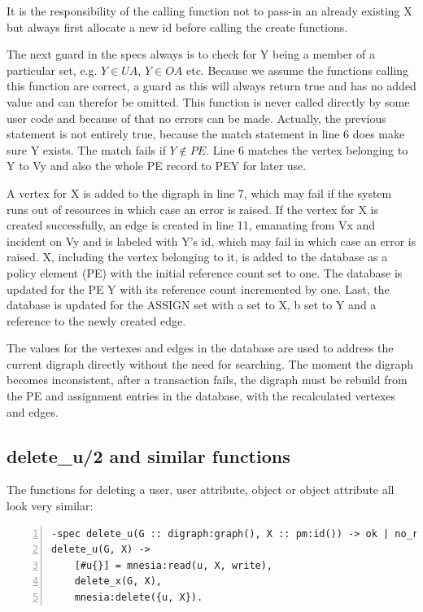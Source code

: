 \documentclass[12pt,a4paper,titlepage]{book}
\begin{document}
		It is the responsibility of the calling function not to pass-in an already existing X but always first allocate a new id before calling the create functions.
		
		The next guard in the specs always is to check for Y being a member of a particular set, e.g. $ Y \in UA $, $ Y \in OA $ etc. Because we assume the functions calling this function are correct, a guard as this will always return true and has no added value and can therefor be omitted. This function is never called directly by some user code and because of that no errors can be made. Actually, the previous statement is not entirely true, because the match statement in line 6 does make sure Y exists. The match fails if $ Y \notin PE $. Line 6 matches the vertex belonging to Y to Vy and also the whole PE record to PEY for later use.
		
		A vertex for X is added to the digraph in line 7, which may fail if the system runs out of resources in which case an error is raised. If the vertex for X is created successfully, an edge is created in line 11, emanating from Vx and incident on Vy and is labeled with Y's id, which may fail in which case an error is raised. X, including the vertex belonging to it, is added to the database as a policy element (PE) with the initial reference count set to one. The database is updated for the PE Y with its reference count incremented by one. Last, the database is updated for the ASSIGN set with a set to X, b set to Y and a reference to the newly created edge.
		
		The values for the vertexes and edges in the database are used to address the current digraph directly without the need for searching. The moment the digraph becomes inconsistent, after a transaction fails, the digraph must be rebuild from the PE and assignment entries in the database, with the recalculated vertexes and edges.
		
	\subsection{delete\_u/2 and similar functions}
	
		The functions for deleting a user, user attribute, object or object attribute all look very similar:
		
		\begin{lstlisting}[caption={delete\_u/2}, basicstyle=\footnotesize, breaklines=false, numbers=left]
-spec delete_u(G :: digraph:graph(), X :: pm:id()) -> ok | no_return().
delete_u(G, X) ->
    [#u{}] = mnesia:read(u, X, write),
    delete_x(G, X),
    mnesia:delete({u, X}). \end{lstlisting}
	
\end{document}
